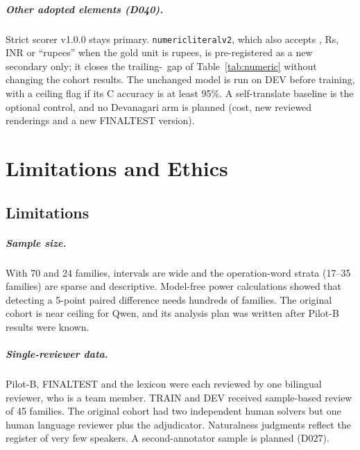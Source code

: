 \documentclass[12pt,a4paper,oneside]{report}
\renewcommand{\_}{\oldunderscore\allowbreak}
\newcommand{\rs}{\rupee}
\begin{document}
\paragraph{Other adopted elements (D040).} Strict scorer v1.0.0 stays primary. \texttt{numeric\_literal\_v2}, which also accepts \rs, Rs, INR or ``rupees'' when the gold unit is rupees, is pre-registered as a new secondary only; it closes the trailing-\rs\ gap of Table~\ref{tab:numeric} without changing the cohort results. The unchanged model is run on DEV before training, with a ceiling flag if its C accuracy is at least 95\%. A self-translate baseline is the optional control, and no Devanagari arm is planned (cost, new reviewed renderings and a new FINAL\_TEST version).




\chapter{Limitations and Ethics}
\label{ch:limits}

\section{Limitations}

\paragraph{Sample size.} With 70 and 24 families, intervals are wide and the operation-word strata (17--35 families) are sparse and descriptive. Model-free power calculations showed that detecting a 5-point paired difference needs hundreds of families. The original cohort is near ceiling for Qwen, and its analysis plan was written after Pilot-B results were known.

\paragraph{Single-reviewer data.} Pilot-B, FINAL\_TEST and the lexicon were each reviewed by one bilingual reviewer, who is a team member. TRAIN and DEV received sample-based review of 45 families. The original cohort had two independent human solvers but one human language reviewer plus the adjudicator. Naturalness judgments reflect the register of very few speakers. A second-annotator sample is planned (D027).
\end{document}
